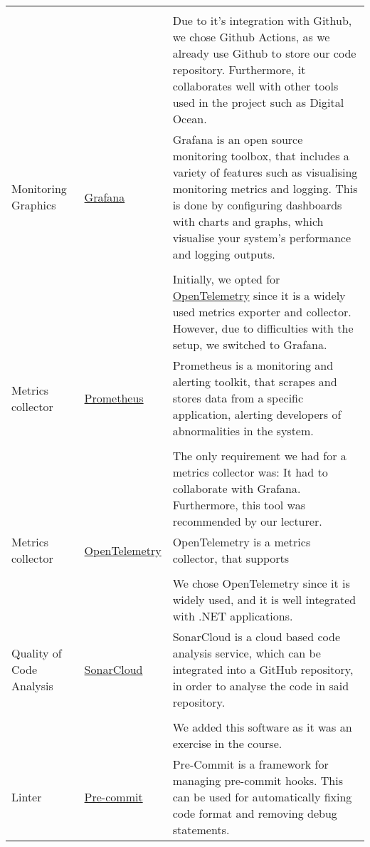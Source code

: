 \begin{longtable}{|p{}|p{} | p{}|}
    &&\\
    && Due to it's integration with Github, we chose Github Actions, as we already use Github to store our code repository. Furthermore, it collaborates well with other tools used in the project such as Digital Ocean.\\
    \hline
    Monitoring Graphics & \href{https://grafana.com/}{Grafana} & Grafana is an open source monitoring toolbox, that includes a variety of features such as visualising monitoring metrics and logging. This is done by configuring dashboards with charts and graphs, which visualise your system's performance and logging outputs.\\
    &&\\
    && Initially, we opted for \href{https://opentelemetry.io/}{OpenTelemetry} since it is a widely used metrics exporter and collector. However, due to difficulties with the setup, we switched to Grafana.\\ %
    \hline
    Metrics collector & \href{https://prometheus.io/docs/}{Prometheus} & Prometheus is a monitoring and alerting toolkit, that scrapes and stores data from a specific application, alerting developers of abnormalities in the system.\\
    &&\\
    && The only requirement we had for a metrics collector was: It had to collaborate with Grafana. Furthermore, this tool was recommended by our lecturer.\\
    \hline
    Metrics collector & \href{https://opentelemetry.io/docs/languages/}{OpenTelemetry} & OpenTelemetry is a metrics collector, that supports \\
    &&\\
    && We chose OpenTelemetry since it is widely used, and it is well integrated with .NET applications.\\
    \hline
    Quality of Code Analysis & \href{https://www.sonarsource.com/products/sonarcloud/}{SonarCloud} & SonarCloud is a cloud based code analysis service, which can be integrated into a GitHub repository, in order to analyse the code in said repository.\\ %
    &&\\
    && We added this software as it was an exercise in the course.\\
    \hline
    Linter & \href{https://pre-commit.com/}{Pre-commit} & Pre-Commit is a framework for managing pre-commit hooks. This can be used for automatically fixing code format and removing debug statements.\\

\end{longtable}
